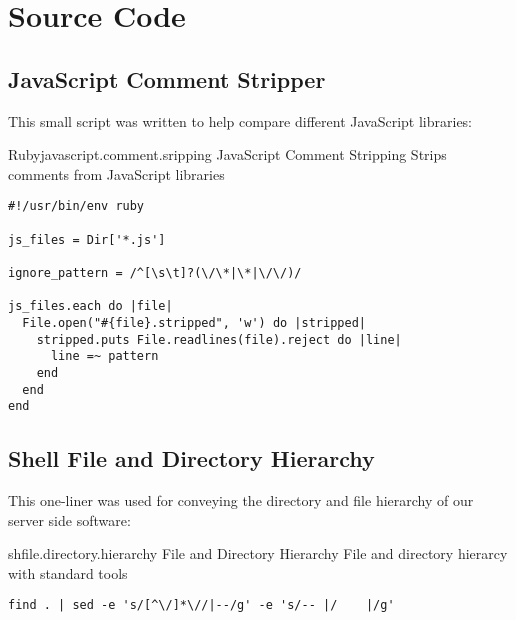 \chapter{Source Code}

\section{JavaScript Comment Stripper}
\label{section:source.code.javascript.comment.stripper}

This small script was written to help
compare different JavaScript libraries:


\begin{scode}{Ruby}{javascript.comment.sripping}{%
  JavaScript Comment Stripping}{%
  Strips comments from JavaScript libraries}
\begin{lstlisting}
#!/usr/bin/env ruby

js_files = Dir['*.js']

ignore_pattern = /^[\s\t]?(\/\*|\*|\/\/)/

js_files.each do |file|
  File.open("#{file}.stripped", 'w') do |stripped| 
    stripped.puts File.readlines(file).reject do |line|
      line =~ pattern
    end
  end
end
\end{lstlisting}
\end{scode}

\section{Shell File and Directory Hierarchy}
\label{section:source.code.hierarchy}

This one-liner was used for conveying the directory and file hierarchy of our
server side software:

\begin{scode}{sh}{file.directory.hierarchy}{%
   File and Directory Hierarchy}{%
  File and directory hierarcy with standard  tools}
\begin{lstlisting}
find . | sed -e 's/[^\/]*\//|--/g' -e 's/-- |/    |/g'
\end{lstlisting}
\end{scode}
